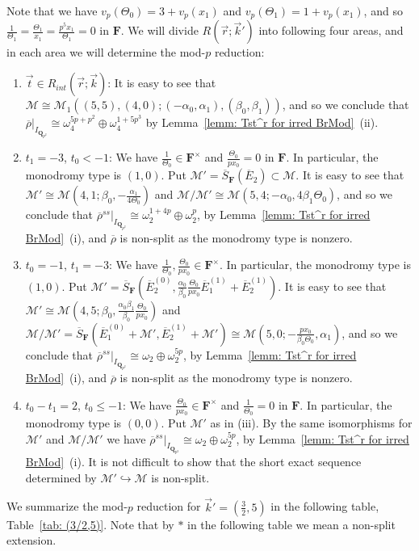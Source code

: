 \documentclass[11pt]{amsart}
\theoremstyle{definition}
\numberwithin{equation}{subsection}
\theoremstyle{plain}
\theoremstyle{plain}
\theoremstyle{plain}
\theoremstyle{plain}
\theoremstyle{plain}
\theoremstyle{plain}
\theoremstyle{plain}
\theoremstyle{plain}
\theoremstyle{plain}
\theoremstyle{plain}
\theoremstyle{plain}
\theoremstyle{plain}
\theoremstyle{definition}
\theoremstyle{definition}
\theoremstyle{definition}
\theoremstyle{remark}
\renewcommand{\(}{\textup{(}}
\renewcommand{\)}{\textup{)}}
\newcommand{\Q}{\mathbf{Q}}
\newcommand{\F}{\mathbf{F}}
\newcommand{\barS}{\overline{S}}
\newcommand{\rhobar}{\overline{\rho}}
\newcommand{\cM}{\mathcal{M}}
\newcommand{\barE}{\overline{E}}
\newcommand{\vr}{\vec{r}}
\newcommand{\vk}{\vec{k}}
\newcommand{\IQptwo}{{I_{\Q_{p^2}}}}
\begin{document}
Note that we have $v_p(\Theta_0)=3+v_p(x_1)$ and $v_p(\Theta_1)=1+v_p(x_1)$, and so $\frac{1}{\Theta_1}=\frac{\Theta_1}{x_1}=\frac{p^5x_1}{\Theta_1}=0$ in $\F$. We will divide $R(\vr;\vk')$ into following four areas, and in each area we will determine the mod-$p$ reduction:
\begin{enumerate}[leftmargin=*]
  \item $\vec{t}\in R_{int}(\vr;\vk)$: It is easy to see that $\cM\cong\cM_1((5,5),(4,0);(-\alpha_0,\alpha_1),(\beta_0,\beta_1))$, and so we conclude that $\rhobar|_\IQptwo\cong\omega_4^{5p+p^2}\oplus\omega_4^{1+5p^3}$ by Lemma~\ref{lemm: Tst^r for irred BrMod}~(ii).
  \item $t_1=-3$, $t_0<-1$: We have $\frac{1}{\Theta_0}\in\F^\times$ and $\frac{\Theta_0}{px_0}=0$ in $\F$. In particular, the monodromy type is $(1,0)$. Put $\cM'=\barS_{\F}(\barE_2)\subset\cM$. It is easy to see that $\cM'\cong \cM(4,1;\beta_0,-\frac{\alpha_1}{4\Theta_0})$ and $\cM/\cM'\cong \cM(5,4;-\alpha_0,4\beta_1\Theta_0)$, and so we conclude that $\rhobar^{ss}|_\IQptwo\cong \omega_2^{1+4p}\oplus\omega_2^p$, by Lemma~\ref{lemm: Tst^r for irred BrMod}~(i), and $\rhobar$ is non-split as the monodromy type is nonzero.
  \item $t_0=-1$, $t_1=-3$: We have $\frac{1}{\Theta_0},\frac{\Theta_0}{px_0}\in \F^\times$. In particular, the monodromy type is $(1,0)$. Put $\cM'=\barS_{\F}(\barE_2^{(0)}, \frac{\alpha_0}{\beta_0}\frac{\Theta_0}{px_0}\barE_1^{(1)}+\barE_2^{(1)})$. It is easy to see that $\cM'\cong\cM(4,5;\beta_0,\frac{\alpha_0\beta_1}{\beta_0}\frac{\Theta_0}{px_0})$ and $\cM/\cM'=\barS_{\F}(\barE_1^{(0)}+\cM',\barE_2^{(1)}+\cM')\cong \cM(5,0;-\frac{px_0}{\beta_0\Theta_0},\alpha_1)$, and so we conclude that $\rhobar^{ss}|_\IQptwo\cong\omega_2\oplus\omega_2^{5p}$, by Lemma~\ref{lemm: Tst^r for irred BrMod}~(i), and $\rhobar$ is non-split as the monodromy type is nonzero.
  \item $t_0-t_1=2$, $t_0\leq -1$: We have $\frac{\Theta_0}{px_0}\in\F^\times$ and $\frac{1}{\Theta_0}=0$ in $\F$. In particular, the monodromy type is $(0,0)$. Put $\cM'$ as in (iii). By the same isomorphisms for $\cM'$ and $\cM/\cM'$ we have $\rhobar^{ss}|_\IQptwo\cong\omega_2\oplus\omega_2^{5p}$, by Lemma~\ref{lemm: Tst^r for irred BrMod}~(i). It is not difficult to show that the short exact sequence determined by $\cM'\hookrightarrow \cM$ is non-split.
\end{enumerate}
We summarize the mod-$p$ reduction for $\vk'=(\frac{3}{2},5)$ in the following table, Table~\ref{tab: (3/2,5)}. Note that by $\ast$ in the following table we mean a non-split extension.
\end{document}
